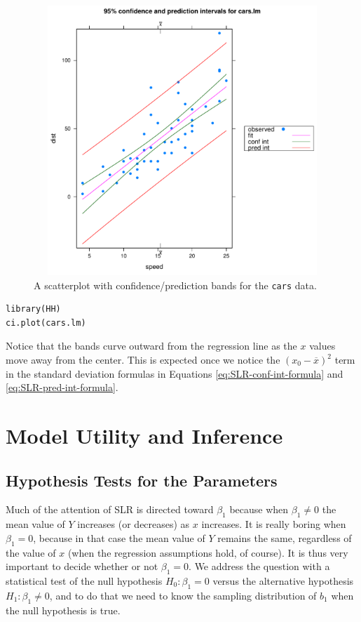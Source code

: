 \documentclass[captions=tableheading]{scrbook}
\begin{document}
\begin{figure}[ht!]
  \includegraphics[width=5in, height=4in]{img/carscipi.pdf}
  \caption[Scatterplot with confidence/prediction bands for the \texttt{cars} data]{\small A scatterplot with confidence/prediction bands for the \texttt{cars} data.}
  \label{fig:Scatter-cars-CIPI}
\end{figure}


\begin{verbatim}
library(HH)
ci.plot(cars.lm)
\end{verbatim}

Notice that the bands curve outward from the regression line as the \(x\) values move away from the center. This is expected once we notice the \((x_{0}-\overline{x})^{2}\) term in the standard deviation formulas in Equations \ref{eq:SLR-conf-int-formula} and \ref{eq:SLR-pred-int-formula}.
\section{Model Utility and Inference}
\label{sec-1-3}

\label{sec:Model-Utility-SLR}
\subsection{Hypothesis Tests for the Parameters}
\label{sec-1-3-1}

\label{sub:slr-hypoth-test-params}

Much of the attention of SLR is directed toward \(\beta_{1}\) because when \( \beta_{1}\neq 0 \) the mean value of \(Y\) increases (or decreases) as \(x\) increases. It is really boring when \(\beta_{1}=0\), because in that case the mean value of \(Y\) remains the same, regardless of the value of \(x\) (when the regression assumptions hold, of course). It is thus very important to decide whether or not \( \beta_{1} = 0 \). We address the question with a statistical test of the null hypothesis \(H_{0}:\beta_{1}=0\) versus the alternative hypothesis \(H_{1}:\beta_{1}\neq0\), and to do that we need to know the sampling distribution of \(b_{1}\) when the null hypothesis is true.
\end{document}
